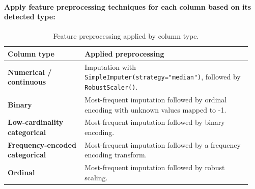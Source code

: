 \paragraph{Apply feature preprocessing techniques for each column based on its detected type:}\par

\begin{table}[!htbp]
\centering
\small
\renewcommand{\arraystretch}{1.15}
\setlength{\tabcolsep}{4pt}
\caption{Feature preprocessing applied by column type.}
\begin{tabular}{p{0.30\linewidth}p{0.65\linewidth}}
\toprule
\textbf{Column type} & \textbf{Applied preprocessing}\\
\midrule
\textbf{Numerical / continuous} & Imputation with \texttt{SimpleImputer(strategy="median")}, followed by \texttt{RobustScaler()}.\\
\textbf{Binary} & Most-frequent imputation followed by ordinal encoding with unknown values mapped to -1.\\
\textbf{Low-cardinality categorical} & Most-frequent imputation followed by binary encoding.\\
\textbf{Frequency-encoded categorical} & Most-frequent imputation followed by a frequency encoding transform.\\
\textbf{Ordinal} & Most-frequent imputation followed by robust scaling.\\
\bottomrule
\end{tabular}
\end{table}
